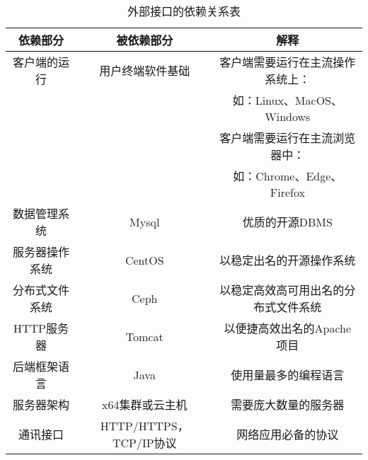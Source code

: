 \begin{table}[htbp]
\centering
\caption{外部接口的依赖关系表} \label{tab:simpletable}
\begin{tabular}{|c|c|c|}
    \hline
    依赖部分 & 被依赖部分 & 解释  \\
    \hline
    客户端的运行 & 用户终端软件基础 & 客户端需要运行在主流操作系统上：\\ & & 如：Linux、MacOS、Windows \\ & & 客户端需要运行在主流浏览器中： \\ & & 如：Chrome、Edge、Firefox \\
    \hline
    数据管理系统 & Mysql & 优质的开源DBMS \\
    \hline
    服务器操作系统 & CentOS & 以稳定出名的开源操作系统\\
    \hline
    分布式文件系统 & Ceph & 以稳定高效高可用出名的分布式文件系统\\
    \hline
    HTTP服务器 & Tomcat & 以便捷高效出名的Apache项目 \\
    \hline
    后端框架语言 & Java & 使用量最多的编程语言\\
    \hline
    服务器架构 & x64集群或云主机 & 需要庞大数量的服务器\\
    \hline
    通讯接口 & HTTP/HTTPS，TCP/IP协议 & 网络应用必备的协议 \\
    \hline
    
\end{tabular}
\end{table} 



    